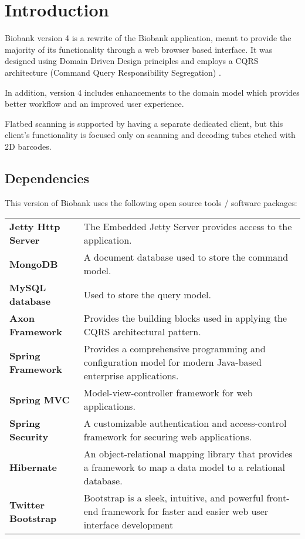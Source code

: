 \chapter{Introduction}

Biobank version 4 is a rewrite of the Biobank application, meant to provide the
majority of its functionality through a web browser based interface. It was
designed using Domain Driven Design principles \cite{evans2004domain} and
employs a CQRS architecture (Command Query Responsibility Segregation)
\cite{vernon2013implementing}.

In addition, version 4 includes enhancements to the domain model which provides
better workflow and an improved user experience.

Flatbed scanning is supported by having a separate dedicated client, but this
client's functionality is focused only on scanning and decoding tubes etched
with 2D barcodes.

\section{Dependencies}

This version of Biobank uses the following open source tools / software packages:

\noindent\begin{tabularx}{\textwidth}{@{} >{\bfseries}p{3.5cm} X}

  Jetty Http Server & The Embedded Jetty Server provides access to the
  application. \\[3px]

  MongoDB & A document database used to store the command model. \\[3px]

  MySQL database & Used to store the query model. \\[3px]

  Axon Framework & Provides the building blocks used in applying the
  CQRS architectural pattern. \\[3px]

  Spring Framework & Provides a comprehensive programming and
  configuration model for modern Java-based enterprise applications.\\[3px]

  Spring MVC & Model-view-controller framework for web applications.\\[3px]

  Spring Security & A customizable authentication and access-control framework
  for securing web applications.\\[3px]

  Hibernate & An object-relational mapping library that provides a framework to
  map a data model to a relational database. \\[3px]

  Twitter Bootstrap & Bootstrap is a sleek, intuitive, and powerful
  front-end framework for faster and easier web user interface development
  \cite{bootstrap} \\

\end{tabularx}

